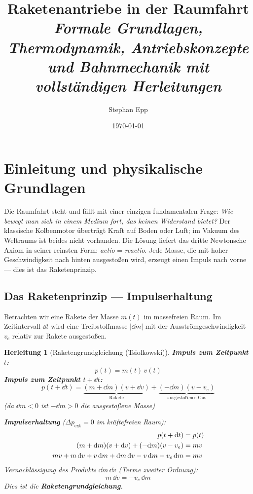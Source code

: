 ﻿\documentclass[12pt,a4paper]{article}
\title{Raketenantriebe in der Raumfahrt\\[0.4em]
  \large\textit{Formale Grundlagen, Thermodynamik, Antriebskonzepte\\
und Bahnmechanik mit vollst\"{a}ndigen Herleitungen}}
\author{Stephan Epp}
\date{\today}
\newtheorem{herleitung}{Herleitung}[section]
\newcommand{\ve}{v_e}
\begin{document}
\maketitle

\tableofcontents
\newpage

\section{Einleitung und physikalische Grundlagen}

Die Raumfahrt steht und fällt mit einer einzigen fundamentalen Frage: \emph{Wie bewegt
man sich in einem Medium fort, das keinen Widerstand bietet?} Der klassische
Kolbenmotor überträgt Kraft auf Boden oder Luft; im Vakuum des Weltraums ist beides
nicht vorhanden. Die Lösung liefert das dritte Newtonsche Axiom in seiner reinsten
Form: \textit{actio} = \textit{reactio}. Jede Masse, die mit hoher Geschwindigkeit
nach hinten ausgestoßen wird, erzeugt einen Impuls nach vorne --- dies ist das
Raketenprinzip.

\subsection{Das Raketenprinzip --- Impulserhaltung}

Betrachten wir eine Rakete der Masse $m(t)$ im massefreien Raum. Im Zeitintervall
$\dd t$ wird eine Treibstoffmasse $|\dd m|$ mit der Ausströmgeschwindigkeit $\ve$
relativ zur Rakete ausgestoßen.

\begin{herleitung}[Raketengrundgleichung (Tsiolkowski)]
\textbf{Impuls zum Zeitpunkt $t$:}
\[
  p(t) = m(t)\,v(t)
\]
\textbf{Impuls zum Zeitpunkt $t + \dd t$:}
\[
  p(t+\dd t) = \underbrace{(m+\dd m)(v+\dd v)}_{\text{Rakete}} +
               \underbrace{(-\dd m)(v - \ve)}_{\text{ausgestoßenes Gas}}
\]
(da $\dd m < 0$ ist $-\dd m > 0$ die ausgestoßene Masse)

\textbf{Impulserhaltung} ($\Delta p_{\text{ext}} = 0$ im kräftefreien Raum):
\begin{align}
  p(t+\dd t) &= p(t) \notag\\
  (m+\dd m)(v+\dd v) + (-\dd m)(v-\ve) &= mv \notag\\
  mv + m\,\dd v + v\,\dd m + \dd m\,\dd v - v\,\dd m + \ve\,\dd m &= mv \notag
\end{align}
Vernachlässigung des Produkts $\dd m\,\dd v$ (Terme zweiter Ordnung):
\[
  \boxed{m\,\dd v = -\ve\,\dd m}
\]
Dies ist die \textbf{Raketengrundgleichung}.
\end{herleitung}
\end{document}
